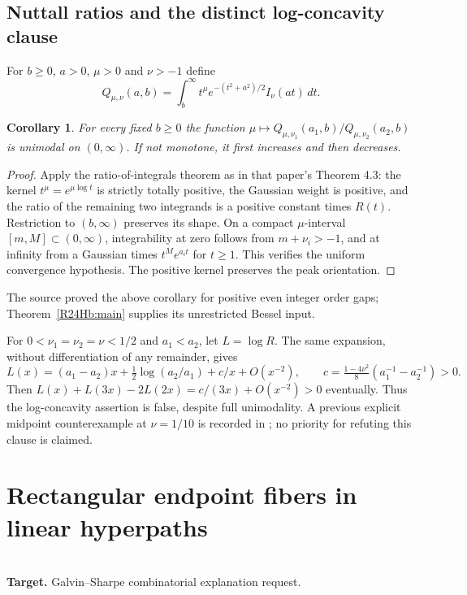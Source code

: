 \documentclass[11pt,a4paper]{article}
\newtheorem{SourceRceHbcorollary}[SourceRceHbtheorem]{Corollary}
\begin{document}
\subsection{Nuttall ratios and the distinct log-concavity clause}
For $b\ge0$, $a>0$, $\mu>0$ and $\nu>-1$ define
\[
 Q_{\mu,\nu}(a,b)=\int_b^\infty t^\mu e^{-(t^2+a^2)/2}I_\nu(at)\,dt .
\]
\begin{SourceRceHbcorollary}
For every fixed $b\ge0$ the function
$\mu\mapsto Q_{\mu,\nu_1}(a_1,b)/Q_{\mu,\nu_2}(a_2,b)$ is unimodal
on $(0,\infty)$. If not monotone, it first increases and then decreases.
\end{SourceRceHbcorollary}
\begin{proof}
Apply the ratio-of-integrals theorem \cite[Theorem 2.6]{R24Hq:KVZ} as in that
paper's Theorem 4.3: the kernel $t^\mu=e^{\mu\log t}$ is strictly
totally positive, the Gaussian weight is positive, and the ratio of
the remaining two integrands is a positive constant times $R(t)$.
Restriction to $(b,\infty)$ preserves its shape. On a compact
$\mu$-interval $[m,M]\subset(0,\infty)$, integrability at zero follows
from $m+\nu_i>-1$, and at infinity from a Gaussian times
$t^M e^{a_i t}$ for $t\ge1$. This verifies the uniform convergence
hypothesis. The positive kernel preserves the peak orientation.
\end{proof}
The source proved the above corollary for positive even integer order
gaps; Theorem~\ref{R24Hb:main} supplies its unrestricted Bessel input.

For $0<\nu_1=\nu_2=\nu<1/2$ and $a_1<a_2$, let $L=\log R$.
The same expansion, without differentiation of any remainder, gives
\[
 L(x)=(a_1-a_2)x+\tfrac12\log(a_2/a_1)+c/x+O(x^{-2}),\qquad
 c=\tfrac{1-4\nu^2}{8}(a_1^{-1}-a_2^{-1})>0 .
\]
Then $L(x)+L(3x)-2L(2x)=c/(3x)+O(x^{-2})>0$ eventually. Thus the
log-concavity assertion is false, despite full unimodality. A previous
explicit midpoint counterexample at $\nu=1/10$ is recorded in \cite{R24Hb:TT};
no priority for refuting this clause is claimed.
\endgroup


\clearpage

\section{Rectangular endpoint fibers in linear hyperpaths}
\label{section:R24T}
\\[3pt]
\noindent\textbf{Target.} Galvin--Sharpe combinatorial explanation request.
\end{document}
